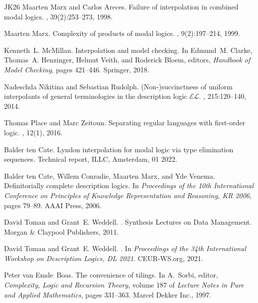 \documentclass[10pt,a4paper]{amsart}
\theoremstyle{plain}
\theoremstyle{definition}
\begin{document}
\begin{thebibliography}{{}JK{\etalchar{+}}26}
Maarten Marx and Carlos Areces.
\newblock Failure of interpolation in combined modal logics.
, 39(2):253--273, 1998.

Maarten Marx.
\newblock Complexity of products of modal logics.
, 9(2):197--214, 1999.

Kenneth~L. McMillan.
\newblock Interpolation and model checking.
\newblock In Edmund~M. Clarke, Thomas~A. Henzinger, Helmut Veith, and Roderick Bloem, editors, {\em Handbook of Model Checking}, pages 421--446. Springer, 2018.

Nadeschda Nikitina and Sebastian Rudolph.
\newblock ({N}on-)succinctness of uniform interpolants of general terminologies in the description logic $\mathcal{EL}$.
, 215:120--140, 2014.

Thomas Place and Marc Zeitoun.
\newblock Separating regular languages with first-order logic.
, 12(1), 2016.

Balder ten Cate.
\newblock Lyndon interpolation for modal logic via type elimination sequences.
\newblock Technical report, ILLC, Amsterdam, 01 2022.

Balder ten Cate, Willem Conradie, Maarten Marx, and Yde Venema.
\newblock Definitorially complete description logics.
\newblock In {\em Proceedings of the 10th International Conference on Principles of Knowledge Representation and Reasoning, {KR} 2006}, pages 79--89. {AAAI} Press, 2006.

David Toman and Grant~E. Weddell.
.
\newblock Synthesis Lectures on Data Management. Morgan {\&} Claypool Publishers, 2011.

David Toman and Grant~E. Weddell.
.
\newblock In {\em Proceedings of the 34th International Workshop on Description Logics, {DL} 2021}. CEUR-WS.org, 2021.

Peter van Emde~Boas.
\newblock The convenience of tilings.
\newblock In A.~Sorbi, editor, {\em Complexity, Logic and Recursion Theory}, volume 187 of {\em Lecture Notes in Pure and Applied Mathematics}, pages 331--363. Marcel Dekker Inc., 1997.


\end{thebibliography}
\end{document}
